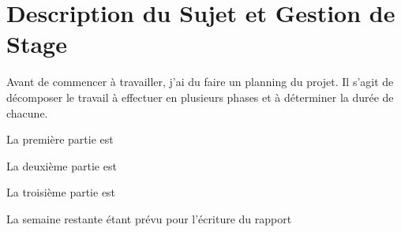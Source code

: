 \chapter{Description du Sujet et Gestion de Stage}
\label{chap:sujet}

Avant de commencer à travailler, j'ai du faire un planning du projet. Il s'agit de décomposer le travail à
effectuer en plusieurs phases et à déterminer la durée de chacune.

La première partie est 

La deuxième partie est 

La troisième partie est

La semaine restante étant prévu pour l'écriture du rapport


